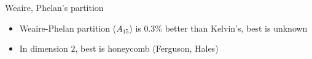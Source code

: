 \documentclass{beamer}
\begin{document}
{\begin{center}
\begin{minipage}[b]{5.0cm}
\par
Weaire, Phelan's partition
\end{minipage}
\end{center}
\begin{itemize}
\item Weaire-Phelan partition ($A_{15}$) is 0.3\% better than Kelvin's, best is unknown 
\item In dimension $2$, best is honeycomb (Ferguson, Hales)
\end{itemize}
}





\end{document}
